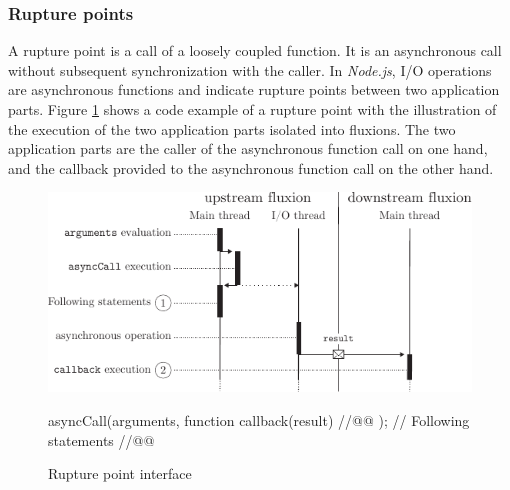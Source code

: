 

\subsubsection{Rupture points} \label{chapter5:flx-compiler:analyzer:rupture}

A rupture point is a call of a loosely coupled function.
It is an asynchronous call without subsequent synchronization with the caller.
In \textit{Node.js}, I/O operations are asynchronous functions and indicate rupture points between two application parts.
Figure \ref{fig:basicrp} shows a code example of a rupture point with the illustration of the execution of the two application parts isolated into fluxions.
The two application parts are the caller of the asynchronous function call on one hand, and the callback provided to the asynchronous function call on the other hand.

\begin{figure}[h!]
  \includegraphics[width=\linewidth]{../resources/basicrp.pdf}
  \begin{code}
asyncCall(arguments, function callback(result){ //@@ });
// Following statements //@@
  \end{code}
  \caption{Rupture point interface}
  \label{fig:basicrp}
\end{figure}

